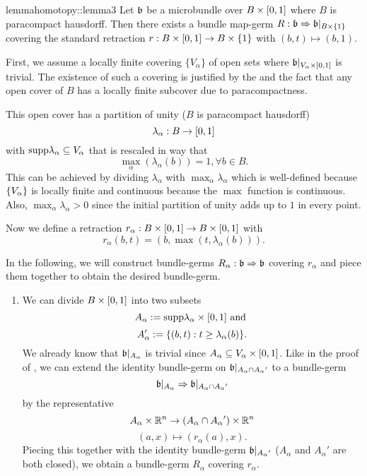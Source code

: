 \begin{scope}
    \newcommand{\A} {
        A_\alpha{}
    }

    \begin{mystatement}{lemma}{homotopy::lemma3}
        Let $\bb$ be a microbundle over $B \times{} [0, 1]$ where $B$ is paracompact hausdorff.
        Then there exists a bundle map-germ $\germdef{R}{\bb}{\bb[\cylup{B}]}$
        covering the standard retraction $r: B \times{} [0, 1] \to B \times{} \{1\}$ with $(b, t) \mapsto (b, 1)$.
    \end{mystatement}

    \begin{myproof}
        First, we assume a locally finite covering $\{V_\alpha\}$ of open sets
        where $\bb[\cyl{V_\alpha}]$ is trivial.
        The existence of such a covering is justified by the  and
        the fact that any open cover of $B$ has a locally finite subcover due to paracompactness.

        This open cover has a partition of unity ($B$ is paracompact hausdorff) 
        \[ \lambda_\alpha: B \to [0, 1] \]
        with $\text{supp} \lambda_\alpha \subseteq{} V_\alpha$ that is rescaled in way that
        \[ \max_\alpha(\lambda_\alpha(b)) = 1, \forall b \in B. \]
        This can be achieved by dividing $\lambda_\alpha$ with $\max_\alpha \lambda_\alpha$
        which is well-defined because $\{V_\alpha\}$ is locally finite and continuous
        because the $\max$ function is continuous.
        Also, $\max_\alpha \lambda_\alpha > 0$ since the initial
        partition of unity adds up to $1$ in every point.

        Now we define a retraction $r_\alpha: B \times{} [0, 1] \to B \times{} [0, 1]$ with
        \[ r_\alpha(b, t) = (b, \max(t, \lambda_\alpha(b))). \]

        In the following,
        we will construct bundle-germs $\germdef{R_\alpha}{\bb}{\bb}$ covering $r_\alpha$
        and piece them together to obtain the desired bundle-germ.
        \begin{enumerate}
            \item 
            We can divide $B \times [0, 1]$ into two subsets
            \[ A_\alpha := \text{supp}{\lambda_\alpha} \times{} [0, 1] \text{ and } \]
            \[ A'_\alpha := \{(b, t):t \ge \lambda_\alpha(b)\}. \]
            We already know that $\bb[A_\alpha]$
            is trivial since $A_\alpha \subseteq{} V_\alpha \times{} [0, 1]$.
            Like in the proof of ,
            we can extend the identity bundle-germ on $\bb[\A \cap \A']$ to a bundle-germ
            \[ \germ{\bb[\A]}{\bb[\A \cap \A']} \]
            by the representative
            \[ \A \cross \R^n \to (\A \cap \A') \cross \R^n\]
            \[ (a, x) \mapsto (r_\alpha(a), x). \]
            Piecing this together with the identity
            bundle-germ $\bb[\A']$ ($\A$ and $\A'$ are both closed),
            we obtain a bundle-germ $R_\alpha$ covering $r_\alpha$.
            

\end{enumerate}
\end{myproof}
\end{scope}

